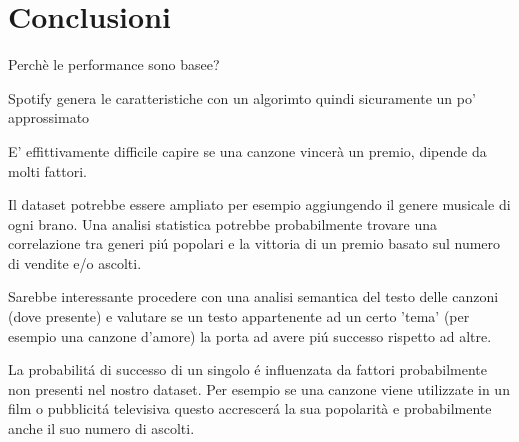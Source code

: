 \chapter{Conclusioni}

Perchè le performance sono basee?

Spotify genera le caratteristiche con un algorimto quindi sicuramente un po' approssimato

E' effittivamente difficile capire se una canzone vincerà un premio, dipende da molti fattori.

Il dataset potrebbe essere ampliato per esempio aggiungendo il genere
musicale di ogni brano. Una analisi statistica potrebbe probabilmente
trovare una correlazione tra generi piú popolari e la vittoria di un
premio basato sul numero di vendite e/o ascolti.

Sarebbe interessante procedere con una analisi semantica del testo
delle canzoni (dove presente) e valutare se un testo appartenente ad
un certo 'tema' (per esempio una canzone d'amore) la porta ad avere
piú successo rispetto ad altre.

La probabilitá di successo di un singolo é influenzata da fattori
probabilmente non presenti nel nostro dataset. Per esempio se una
canzone viene utilizzate in un film o pubblicitá televisiva questo
accrescerá la sua popolarità e probabilmente anche il suo numero di
ascolti.
